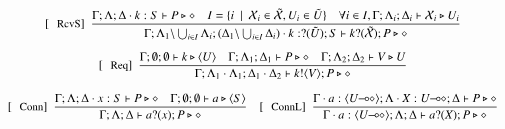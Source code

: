 \begin{figure}[!t]
\[\begin{array}{c}
		\trule{RcvS}~~\tree{
			\Gamma; \Lambda; \Delta \cat k: S \proves P \hastype \Proc
			\quad
			I = \set{i \setbar \var{X}_i \in \tilde{\var{X}}, U_i \in \tilde{U}}
			\quad
			\forall i \in I, \Gamma; \Lambda_i; \Delta_i \proves \var{X}_i \hastype U_i
		}{
			\Gamma; \Lambda_1\backslash\bigcup_{i \in I}\Lambda_i; (\Delta_1\backslash\bigcup_{i \in I}\Delta_i) \cat k: \btinp{\tilde{U}} S \vdash \binp{k}{\tilde{\var{X}}} P \hastype \Proc
		}
		\\[6mm]


		\trule{Req}~~\tree{
			\Gamma; \es; \es \proves k \hastype \chtype{U}
			\quad
			\Gamma; \Lambda_1; \Delta_1 \proves P \hastype \Proc
			\quad
			\Gamma; \Lambda_2; \Delta_2 \proves V \hastype U %
		}{
			\Gamma; \Lambda_1 \cat \Lambda_1; \Delta_1 \cat \Delta_2 \proves \bout{k}{V} P \hastype \Proc
		}
		\\[6mm]

		\trule{Conn}~~\tree{
			\Gamma; \Lambda; \Delta \cat x:S \proves P \hastype \Proc  \quad \Gamma; \emptyset; \emptyset \proves a \hastype \chtype{S}
		}{
			\Gamma; \Lambda; \Delta \proves \binp{a}{x} P \hastype \Proc
		}
		\quad
		\trule{ConnL}~~\tree{
			\Gamma \cat a : \chtype{\lhot{U}}; \Lambda \cat X: \lhot{U}; \Delta \proves P \hastype \Proc
		}{
			\Gamma \cat a : \chtype{\lhot{U}}; \Lambda; \Delta \proves \binp{a}{X} P \hastype \Proc
		}
		\\[4mm]


\end{array}\]
\end{figure}

